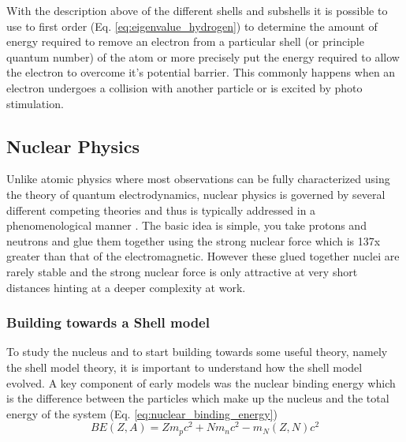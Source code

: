 \documentclass[jon_ringuette_thesis.tex]{subfiles}
\begin{document}
    With the description above of the different shells and subshells it is possible to use to first order (Eq. \ref{eq:eigenvalue_hydrogen}) to determine the amount of energy required to remove an electron from a particular shell (or principle quantum number) of the atom or more precisely put the energy required to allow the electron to overcome it's potential barrier.
    This commonly happens when an electron undergoes a collision with another particle or is excited by photo stimulation.


    \subsection{Nuclear Physics}

    Unlike atomic physics where most observations can be fully characterized using the theory of quantum electrodynamics, nuclear physics is governed by several different competing theories and thus is typically addressed in a phenomenological manner \cite{Krane1988}. The basic idea is simple, you take protons and neutrons and glue them together using the strong nuclear force which is 137x greater than that of the electromagnetic.
    However these glued together nuclei are rarely stable and the strong nuclear force is only attractive at very short distances hinting at a deeper complexity at work.

    \subsubsection{Building towards a Shell model}
    To study the nucleus and to start building towards some useful theory, namely the shell model theory, it is important to understand how the shell model evolved. A key component of early models was the nuclear binding energy which is the difference between the particles which make up the nucleus and the total energy of the system (Eq. \ref{eq:nuclear_binding_energy})
    \begin{equation}
        BE(Z, A) = Z m_p c^2 + Nm_{n}c^2 - m_N(Z, N)c^2
        \label{eq:nuclear_binding_energy}
    \end{equation}
\end{document}
